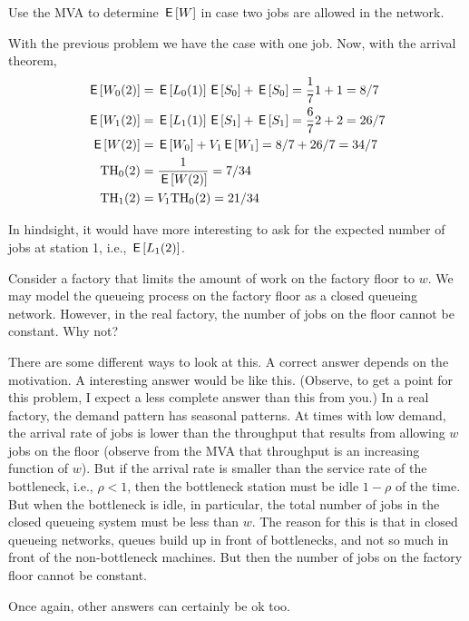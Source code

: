 \begin{exercise}[201804]
 Use the MVA to determine $\,\mathsf{E}\left[W\right]$ in case two jobs are allowed in the network.
\begin{solution}
 With the previous problem we have the case with one job. Now, with the arrival theorem,
 \begin{align*}
\,\mathsf{E}\left[W_{0}(2)\right] &= \,\mathsf{E}\left[L_0(1)\right]\,\mathsf{E}\left[S_0\right] +\,\mathsf{E}\left[S_0\right] = \frac{1}{7} 1 + 1=8/7\\
\,\mathsf{E}\left[W_{1}(2)\right] &= \,\mathsf{E}\left[L_1(1)\right]\,\mathsf{E}\left[S_1\right] +\,\mathsf{E}\left[S_1\right] = \frac{6}{7} 2 + 2 = 26/7\\
\,\mathsf{E}\left[W(2)\right] &= \,\mathsf{E}\left[W_0\right] + V_1 \,\mathsf{E}\left[W_1\right] = 8/7 + 26/7 = 34/7\\
\mathrm{TH}_0(2) &= \frac{1}{\,\mathsf{E}\left[W(2)\right]} = 7/34\\
\mathrm{TH}_1(2)&= V_1 \mathrm{TH}_0(2) = 21/34\\
 \end{align*}

In hindsight, it would have more interesting to ask for the expected number of jobs at station 1, i.e., $\,\mathsf{E}\left[L_1(2)\right]$. 
\end{solution}
\end{exercise}

\begin{exercise}[201804]
Consider a factory that limits the amount of work on the factory floor to $w$. We may model the queueing process on the factory floor as a closed queueing network. However, in the real factory, the number of jobs on the floor cannot be constant. Why not?
\begin{solution}
 There are some different ways to look at this. A correct answer depends on the motivation. A interesting answer would be like this. (Observe, to get a point for this problem, I expect a less complete answer than this from you.) In a real factory, the demand pattern has seasonal patterns. At times with low demand, the arrival rate of jobs is lower than the throughput that results from allowing $w$ jobs on the floor (observe from the MVA that throughput is an increasing function of $w$). But if the arrival rate is smaller than the service rate of the bottleneck, i.e., $\rho<1$, then the bottleneck station must be idle $1-\rho$ of the time. But when the bottleneck is idle, in particular, the total number of jobs in the closed queueing system must be less than $w$. The reason for this is that in closed queueing networks, queues build up in front of bottlenecks, and not so much in front of the non-bottleneck machines. But then the number of jobs on the factory floor cannot be constant. 

Once again, other answers can certainly be ok too. 
\end{solution}
\end{exercise}


